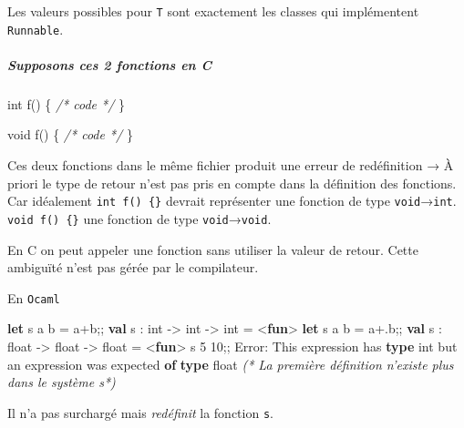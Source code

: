 \documentclass[]{article}
\newenvironment{Shaded}{}{}
\newcommand{\KeywordTok}[1]{\textcolor[rgb]{0.00,0.44,0.13}{\textbf{#1}}}
\newcommand{\DataTypeTok}[1]{\textcolor[rgb]{0.56,0.13,0.00}{#1}}
\newcommand{\DecValTok}[1]{\textcolor[rgb]{0.25,0.63,0.44}{#1}}
\newcommand{\CommentTok}[1]{\textcolor[rgb]{0.38,0.63,0.69}{\textit{#1}}}
\newcommand{\NormalTok}[1]{#1}
\let\oldsubparagraph\subparagraph
\renewcommand{\subparagraph}[1]{\oldsubparagraph{#1}\mbox{}}
\begin{document}
Les valeurs possibles pour \texttt{T} sont exactement les classes qui
implémentent \texttt{Runnable}.

\subparagraph{Supposons ces 2 fonctions en
C}\label{supposons-ces-2-fonctions-en-c}

\begin{Shaded}
\begin{Highlighting}[]
\DataTypeTok{int}\NormalTok{ f() \{}
    \CommentTok{/* code */}
\NormalTok{\}}
\end{Highlighting}
\end{Shaded}

\begin{Shaded}
\begin{Highlighting}[]
\DataTypeTok{void}\NormalTok{ f() \{}
    \CommentTok{/* code */}
\NormalTok{\}}
\end{Highlighting}
\end{Shaded}

Ces deux fonctions dans le même fichier produit une erreur de
redéfinition → À priori le type de retour n'est pas pris en compte dans
la définition des fonctions. Car idéalement \texttt{int\ f()\ \{\}}
devrait représenter une fonction de type \texttt{void}→\texttt{int}.
\texttt{void\ f()\ \{\}} une fonction de type
\texttt{void}→\texttt{void}.

En C on peut appeler une fonction sans utiliser la valeur de retour.
Cette ambiguïté n'est pas gérée par le compilateur.

En \texttt{Ocaml}

\begin{Shaded}
\begin{Highlighting}[]
\KeywordTok{let}\NormalTok{ s a b = a+b;;}
    \KeywordTok{val}\NormalTok{ s : }\DataTypeTok{int}\NormalTok{ -> }\DataTypeTok{int}\NormalTok{ -> }\DataTypeTok{int}\NormalTok{ = <}\KeywordTok{fun}\NormalTok{>}
\KeywordTok{let}\NormalTok{ s a b = a+.b;;}
    \KeywordTok{val}\NormalTok{ s : }\DataTypeTok{float}\NormalTok{ -> }\DataTypeTok{float}\NormalTok{ -> }\DataTypeTok{float}\NormalTok{ = <}\KeywordTok{fun}\NormalTok{>}
\NormalTok{s }\DecValTok{5} \DecValTok{10}\NormalTok{;;}
\NormalTok{Error: This expression has }\KeywordTok{type} \DataTypeTok{int}\NormalTok{ but an expression was expected }\KeywordTok{of} \KeywordTok{type}
         \DataTypeTok{float}
\CommentTok{(* La première définition n'existe plus dans le système s*)}
\end{Highlighting}
\end{Shaded}

Il n'a pas surchargé mais \emph{redéfinit} la fonction \texttt{s}.
\end{document}
